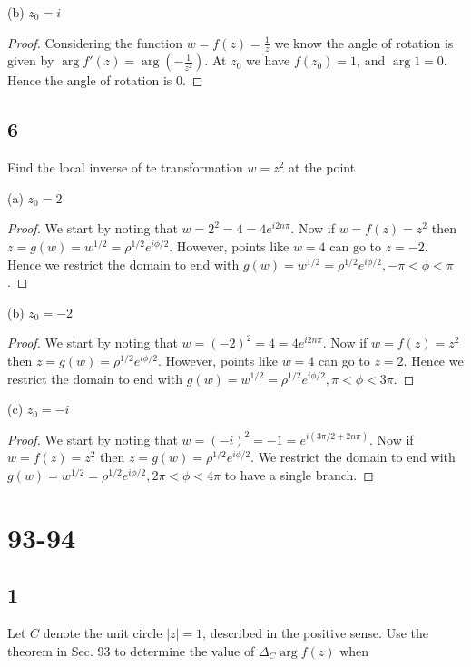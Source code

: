 \documentclass{article}
\begin{document}
(b) $z_0 = i$

\begin{proof}
    Considering the function $w = f(z) = \frac{1}{z}$ we know the angle of
    rotation is given by $\arg f'(z) = \arg \left(-\frac{1}{z^2}\right)$. At
    $z_0$ we have $f(z_0) = 1$, and $\arg 1 = 0$. Hence the angle of rotation
    is $0$.
\end{proof}


\subsection*{6}
Find the local inverse of te transformation $w  = z^2$ at the point

(a) $z_0 = 2$

\begin{proof}
    We start by noting that $w = 2^2 = 4 = 4e^{i2n\pi}$. Now if $w = f(z) = z^2$
    then $z = g(w) = w^{1/2} = \rho^{1/2} e^{i\phi/2}$. However, points like
    $w = 4$ can go to $z = -2$. Hence we restrict the domain to end with
    $g(w) = w^{1/2} = \rho^{1/2} e^{i\phi/2}, -\pi < \phi < \pi$.
\end{proof}

(b) $z_0 = -2$

\begin{proof}
    We start by noting that $w = (-2)^2 = 4 = 4e^{i2n\pi}$. Now if
    $w = f(z) = z^2$ then $z = g(w) = \rho^{1/2} e^{i\phi/2}$. However,
    points like $w = 4$ can go to $z = 2$. Hence we restrict the domain to end with
    $g(w) = w^{1/2} = \rho^{1/2} e^{i\phi/2}, \pi < \phi < 3\pi$.
\end{proof}

(c) $z_0 = -i$
\begin{proof}
    We start by noting that $w = (-i)^2 = -1 = e^{i(3\pi/2 + 2n\pi)}$. Now if
    $w = f(z) = z^2$ then $z = g(w) = \rho^{1/2} e^{i\phi/2}$.
    We restrict the domain to end with
    $g(w) = w^{1/2} = \rho^{1/2} e^{i\phi/2}, 2\pi < \phi < 4\pi$ to have a
    single branch.
\end{proof}

\section*{93-94}
\subsection*{1}
Let $C$ denote the unit circle $|z|=1$, described in the positive sense.
Use the theorem in Sec. 93 to determine the value of $\Delta_C\arg f(z)$ when
\end{document}
